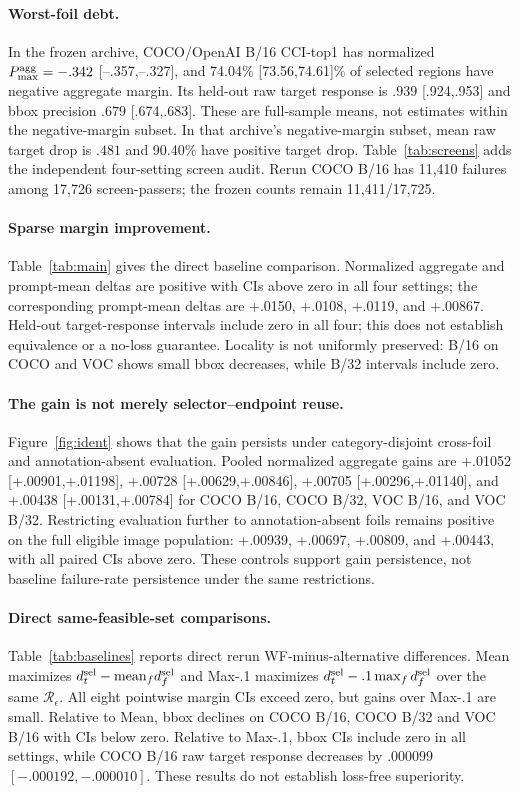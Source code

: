\documentclass[10pt]{article}
\newcommand{\regions}{\mathcal{R}}
\begin{document}
\paragraph{Worst-foil debt.}
In the frozen archive, COCO/OpenAI B/16 CCI-top1 has normalized
$P_{\max}^{\rm agg}=-.342$ [--.357,--.327], and 74.04\% [73.56,74.61]\% of
selected regions have negative aggregate margin. Its held-out raw target
response is $.939$ [.924,.953] and bbox precision $.679$ [.674,.683].
These are full-sample means, not estimates within the negative-margin subset.
In that archive's negative-margin subset, mean raw target drop is $.481$
and 90.40\% have positive target drop. Table~\ref{tab:screens} adds the independent
four-setting screen audit. Rerun COCO B/16 has 11,410 failures among 17,726
screen-passers; the frozen counts remain 11,411/17,725.

\paragraph{Sparse margin improvement.}
Table~\ref{tab:main} gives the direct baseline comparison. Normalized aggregate
and prompt-mean deltas are positive with CIs above zero in all four settings;
the corresponding prompt-mean deltas are +.0150, +.0108, +.0119, and +.00867.
Held-out target-response intervals include zero in all four; this does not
establish equivalence or a no-loss guarantee. Locality is not
uniformly preserved: B/16 on COCO and VOC shows small bbox decreases, while B/32
intervals include zero.

\paragraph{The gain is not merely selector--endpoint reuse.}
Figure~\ref{fig:ident} shows that the gain persists under category-disjoint
cross-foil and annotation-absent evaluation. Pooled normalized aggregate gains
are +.01052 [+.00901,+.01198], +.00728 [+.00629,+.00846], +.00705
[+.00296,+.01140], and +.00438 [+.00131,+.00784] for COCO B/16, COCO B/32,
VOC B/16, and VOC B/32. Restricting evaluation further to annotation-absent
foils remains positive on the full eligible image population: +.00939, +.00697,
+.00809, and +.00443, with all paired CIs above zero. These controls support
gain persistence, not baseline failure-rate persistence under the same restrictions.

\paragraph{Direct same-feasible-set comparisons.}
Table~\ref{tab:baselines} reports direct rerun WF-minus-alternative differences.
Mean maximizes $d_t^{\rm sel}-\mathrm{mean}_f d_f^{\rm sel}$ and Max-.1 maximizes
$d_t^{\rm sel}-.1\max_f d_f^{\rm sel}$ over the same $\regions_\epsilon$.
All eight pointwise margin CIs exceed zero, but gains over Max-.1 are small.
Relative to Mean, bbox declines on COCO B/16, COCO B/32 and VOC B/16 with
CIs below zero. Relative to Max-.1, bbox CIs include zero in all settings,
while COCO B/16 raw target response decreases by $.000099$
$[-.000192,-.000010]$. These results do not establish loss-free superiority.
\end{document}
